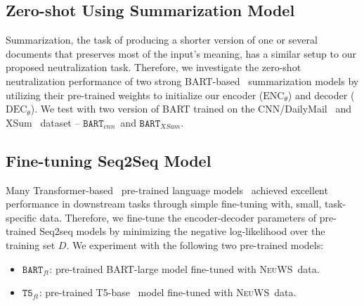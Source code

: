 \documentclass[11pt,a4paper]{article}
\newcommand{\bartCNN}{$\texttt{BART}_{cnn}$}
\newcommand{\bartXSum}{$\texttt{BART}_{XSum}$}
\newcommand{\ourdata}{{\scshape NeuWS}}
\newcommand{\finetune}{$\texttt{BART}_{ft}$}
\newcommand{\tfive}{$\texttt{T5}_{ft}$}
\begin{document}
\subsection{Zero-shot Using Summarization Model}
Summarization, the task of producing a shorter version of one or several documents that preserves most of the input's meaning, has a similar setup to our proposed neutralization task. 
Therefore, we investigate the zero-shot neutralization performance of two strong BART-based~\cite{lewis2019bart} summarization models by utilizing their pre-trained weights to initialize our encoder ($\mathrm{ENC}_{\theta}$) and decoder ($\mathrm{DEC}_{\theta}$). We test with two version of BART trained on the CNN/DailyMail~\cite{hermann2015teaching} and XSum~\cite{narayan2018don} dataset -- \bartCNN~and \bartXSum.

\subsection{Fine-tuning Seq2Seq Model} 
\label{sec:seq2seq}
Many Transformer-based~\cite{vaswani2017attention} pre-trained language models~\cite{raffel2019exploring,lewis2019bart} achieved excellent performance in downstream tasks through simple fine-tuning with, small, task-specific data. 
Therefore, we fine-tune the encoder-decoder parameters of pre-trained Seq2seq models by minimizing the negative log-likelihood over the training set $D$. We experiment with the following two pre-trained models:
\begin{itemize}
    \item \finetune: pre-trained BART-large model fine-tuned with \ourdata~data.
    \item \tfive: pre-trained T5-base~\cite{raffel2019exploring} model fine-tuned with \ourdata~data.
\end{itemize}
\end{document}
